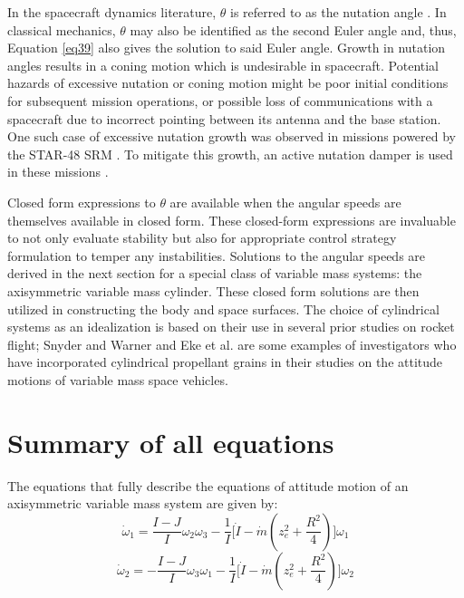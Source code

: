 In the spacecraft dynamics literature, $\theta$ is referred to as the nutation angle \cite{kaplan}. In classical mechanics, $\theta$ may also be identified as the second Euler angle \cite{likinstext} and, thus, Equation \eqref{eq39} also gives the solution to said Euler angle. Growth in nutation angles results in a coning motion which is undesirable in spacecraft. Potential hazards of excessive nutation or coning motion might be poor initial conditions for subsequent mission operations, or possible loss of communications with a spacecraft due to incorrect pointing between its antenna and the base station. One such case of excessive nutation growth was observed in missions powered by the STAR-48 SRM \cite{meyer, flandro, cochran, or, mingorI, mingori2}. To mitigate this growth, an active nutation damper is used in these missions \cite{webster}.

Closed form expressions to $\theta$ are available when the angular speeds are themselves available in closed form. These closed-form expressions are invaluable to not only evaluate stability but also for appropriate control strategy formulation to temper any instabilities. Solutions to the angular speeds are derived in the next section for a special class of variable mass systems: the axisymmetric variable mass cylinder. These closed form solutions are then utilized in constructing the body and space surfaces. The choice of cylindrical systems as an idealization is based on their use in several prior studies on rocket flight; Snyder and Warner \cite{snyder} and Eke et al. \cite{ekewang2,ekemao2} are some examples of investigators who have incorporated cylindrical propellant grains in their studies on the attitude motions of variable mass space vehicles.

\section{Summary of all equations}

The equations that fully describe the equations of attitude 
motion of an axisymmetric variable mass system are given by:
\begin{equation}
  \label{11}
  \dot{\omega}_1 = \frac{I - J}{I} \omega_2\omega_3
  - \frac{1}{I}\bigg[\dot{I} - \dot{m}(z_e^2 + \frac{R^2}{4})\bigg] \omega_1
\end{equation}
\begin{equation}
  \label{12}
    \dot{\omega}_2 = -\frac{I - J}{I} \omega_3\omega_1
    - \frac{1}{I}\bigg[\dot I - \dot{m}(z_e^2 +
    \frac{R^2}{4})\bigg] \omega_2
\end{equation}

